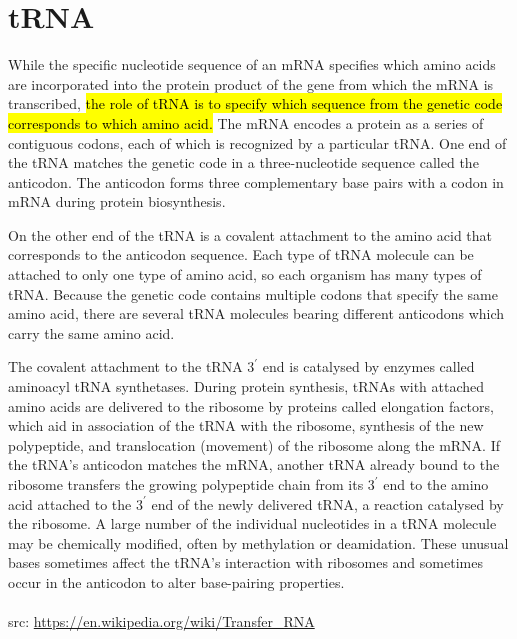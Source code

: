 \newpage
\section*{tRNA}
While the specific nucleotide sequence of an mRNA specifies which amino acids are incorporated into the protein product of the gene from which the mRNA is transcribed, \hl{the role of tRNA is to specify which sequence from the genetic code corresponds to which amino acid.} The mRNA encodes a protein as a series of contiguous codons, each of which is recognized by a particular tRNA. One end of the tRNA matches the genetic code in a three-nucleotide sequence called the anticodon. The anticodon forms three complementary base pairs with a codon in mRNA during protein biosynthesis.

On the other end of the tRNA is a covalent attachment to the amino acid that corresponds to the anticodon sequence. Each type of tRNA molecule can be attached to only one type of amino acid, so each organism has many types of tRNA. Because the genetic code contains multiple codons that specify the same amino acid, there are several tRNA molecules bearing different anticodons which carry the same amino acid.

The covalent attachment to the tRNA $3^{\prime}$ end is catalysed by enzymes called aminoacyl tRNA synthetases. During protein synthesis, tRNAs with attached amino acids are delivered to the ribosome by proteins called elongation factors, which aid in association of the tRNA with the ribosome, synthesis of the new polypeptide, and translocation (movement) of the ribosome along the mRNA. If the tRNA's anticodon matches the mRNA, another tRNA already bound to the ribosome transfers the growing polypeptide chain from its $3^{\prime}$ end to the amino acid attached to the $3^{\prime}$ end of the newly delivered tRNA, a reaction catalysed by the ribosome. A large number of the individual nucleotides in a tRNA molecule may be chemically modified, often by methylation or deamidation. These unusual bases sometimes affect the tRNA's interaction with ribosomes and sometimes occur in the anticodon to alter base-pairing properties.
\\\\src: \url{https://en.wikipedia.org/wiki/Transfer_RNA}